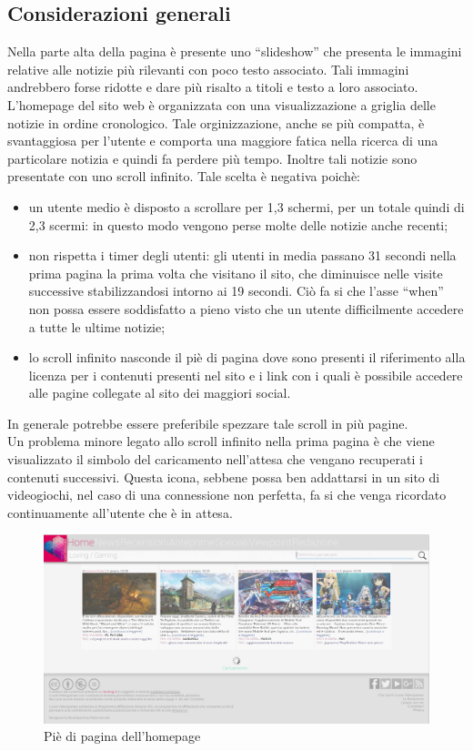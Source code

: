 \documentclass[../ProgettoTecWeb2.tex]{subfiles}
\begin{document}
	\subsection{Considerazioni generali}
		Nella parte alta della pagina è presente uno ``slideshow'' che presenta le immagini relative alle notizie più rilevanti con poco testo associato. Tali immagini andrebbero forse ridotte e dare più risalto a titoli e testo a loro associato.
		L'homepage del sito web è organizzata con una visualizzazione a griglia delle notizie in ordine cronologico. Tale orginizzazione, anche se più compatta, è svantaggiosa per l'utente e comporta una maggiore fatica nella ricerca di una particolare notizia e quindi fa perdere più tempo.
		Inoltre tali notizie sono presentate con uno scroll infinito. Tale scelta è negativa poichè:
		\begin{itemize}
			\item un utente medio è disposto a scrollare per 1,3 schermi, per un totale quindi di 2,3 scermi: in questo modo vengono perse molte delle notizie anche recenti;
			\item non rispetta i timer degli utenti: gli utenti in media passano 31 secondi nella prima pagina la prima volta che visitano il sito, che diminuisce nelle visite successive stabilizzandosi intorno ai 19 secondi. Ciò fa si che l'asse ``when'' non possa essere soddisfatto a pieno visto che un utente difficilmente accedere a tutte le ultime notizie;
			\item lo scroll infinito nasconde il piè di pagina dove sono presenti il riferimento alla licenza per i contenuti presenti nel sito e i link con i quali è possibile accedere alle pagine collegate al sito dei maggiori social. 
		\end{itemize}
		In generale potrebbe essere preferibile spezzare tale scroll in più pagine. \\
		Un problema minore legato allo scroll infinito nella prima pagina è che viene visualizzato il simbolo del caricamento nell'attesa che vengano recuperati i contenuti successivi. Questa icona, sebbene possa ben addattarsi in un sito di videogiochi, nel caso di una connessione non perfetta, fa si che venga ricordato continuamente all'utente che è in attesa.
		\begin{figure} [h]
			\centering
			\includegraphics[scale=0.3]{img/PieDiPaginaHomepage}
			\caption{Piè di pagina dell'homepage}
			\label{fig:AprireProgetto}
		\end{figure}
\end{document}
